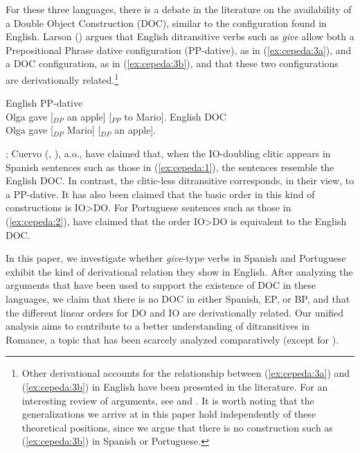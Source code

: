 \documentclass[output=paper,colorlinks,citecolor=brown]{./langscibook}
\begin{document}
For these three languages, there is a debate in the literature on the availability of a Double Object Construction (DOC), similar to the configuration found in English. Larson (\citeyear{Larson1988, Larson2014}) argues that English ditransitive verbs such as \textit{give} allow both a Prepositional Phrase dative configuration (PP-dative), as in (\ref{ex:cepeda:3a}), and a DOC configuration, as in (\ref{ex:cepeda:3b}), and that these two configurations are derivationally related.\footnote{Other derivational accounts for the relationship between (\ref{ex:cepeda:3a}) and (\ref{ex:cepeda:3b}) in English have been presented in the literature. For an interesting review of arguments, see \citet{RappaportHovavLevin2008} and \citet{Hallman2015}. It is worth noting that the generalizations we arrive at in this paper hold independently of these theoretical positions, since we argue that there is no construction such as (\ref{ex:cepeda:3b}) in Spanish or Portuguese.} 

\ea%
    \label{ex:cepeda:3}
	\ea\label{ex:cepeda:3a}
	English PP-dative\\
		Olga gave [$_{DP}$ an apple] [$_{PP}$ to Mario].
	\ex\label{ex:cepeda:3b}
	English DOC\\
		Olga gave [$_{DP}$ Mario] [$_{DP}$ an apple].
	\z
\z

\citet{Demonte1995, Bleam2003}; Cuervo (\citeyear{Cuervo2003}, \citeyear{Cuervo2010Proceedings}), a.o., have claimed that, when the IO-doubling clitic appears in Spanish sentences such as those in (\ref{ex:cepeda:1}), the sentences resemble the English DOC. In contrast, the clitic-less ditransitive corresponds, in their view, to a PP-dative. It has also been claimed that the basic order in this kind of constructions is IO>DO. For Portuguese sentences such as those in (\ref{ex:cepeda:2}), \citet{TorresMoraisSalles2010} have claimed that the order IO>DO is equivalent to the English DOC.

In this paper, we investigate whether \textit{give}-type verbs in Spanish and Portuguese exhibit the kind of derivational relation they show in English. After analyzing the arguments that have been used to support the existence of DOC in these languages, we claim that there is no DOC in either Spanish, EP, or BP, and that the different linear orders for DO and IO are derivationally related. Our unified analysis aims to contribute to a better understanding of ditransitives in Romance, a topic that has been scarcely analyzed comparatively (except for \citealt{Pineda2016}).
\end{document}
